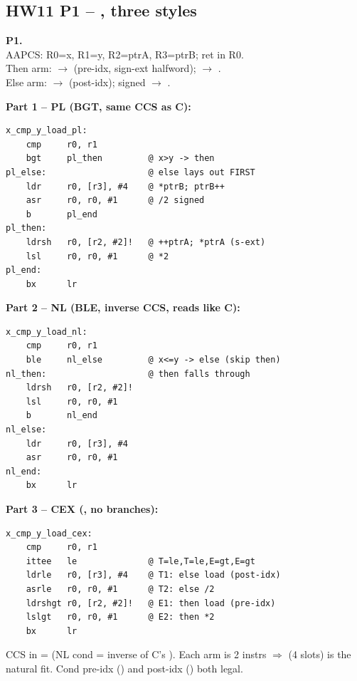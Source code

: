 \subsection{HW11 P1 -- , three styles}
\begin{hwp}\textbf{P1.} \\
AAPCS: R0=x, R1=y, R2=ptrA, R3=ptrB; ret in R0.\\
Then arm:  $\to$  (pre-idx, sign-ext halfword);  $\to$ .\\
Else arm:  $\to$  (post-idx); signed  $\to$ .

\textbf{Part 1 -- PL (BGT, same CCS as C):}
\begin{lstlisting}
x_cmp_y_load_pl:
    cmp     r0, r1
    bgt     pl_then         @ x>y -> then
pl_else:                    @ else lays out FIRST
    ldr     r0, [r3], #4    @ *ptrB; ptrB++
    asr     r0, r0, #1      @ /2 signed
    b       pl_end
pl_then:
    ldrsh   r0, [r2, #2]!   @ ++ptrA; *ptrA (s-ext)
    lsl     r0, r0, #1      @ *2
pl_end:
    bx      lr
\end{lstlisting}

\textbf{Part 2 -- NL (BLE, inverse CCS, reads like C):}
\begin{lstlisting}
x_cmp_y_load_nl:
    cmp     r0, r1
    ble     nl_else         @ x<=y -> else (skip then)
nl_then:                    @ then falls through
    ldrsh   r0, [r2, #2]!
    lsl     r0, r0, #1
    b       nl_end
nl_else:
    ldr     r0, [r3], #4
    asr     r0, r0, #1
nl_end:
    bx      lr
\end{lstlisting}

\textbf{Part 3 -- CEX (, no branches):}
\begin{lstlisting}
x_cmp_y_load_cex:
    cmp     r0, r1
    ittee   le              @ T=le,T=le,E=gt,E=gt
    ldrle   r0, [r3], #4    @ T1: else load (post-idx)
    asrle   r0, r0, #1      @ T2: else /2
    ldrshgt r0, [r2, #2]!   @ E1: then load (pre-idx)
    lslgt   r0, r0, #1      @ E2: then *2
    bx      lr
\end{lstlisting}
CCS in  =  (NL cond = inverse of C's \cee{>}). Each arm is 2 instrs $\Rightarrow$  (4 slots) is the natural fit. Cond pre-idx () and post-idx () both legal.
\end{hwp}


